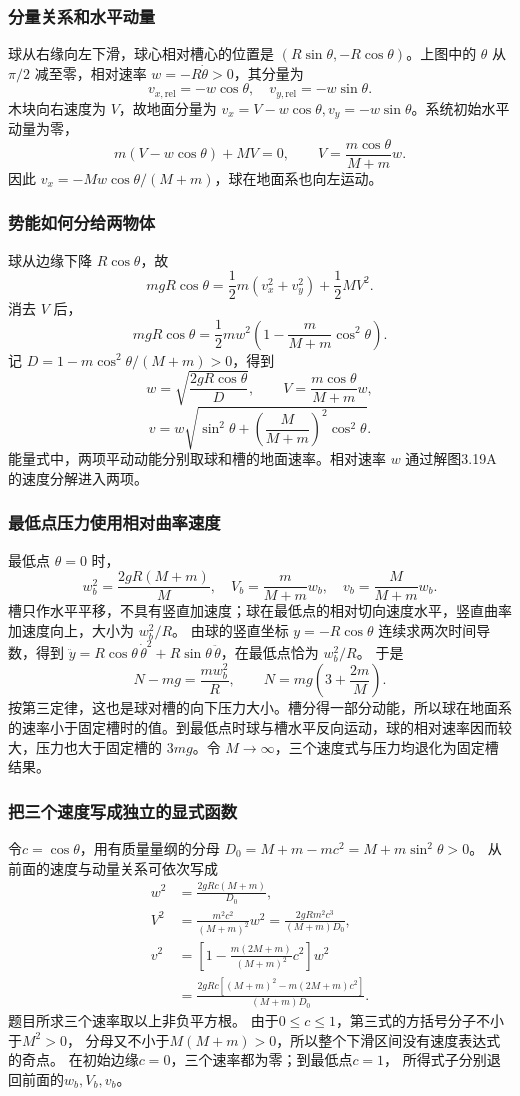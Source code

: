 \documentclass[UTF8,fontset=fandol,a4paper,11pt]{ctexart}
\begin{document}
\subsubsection*{分量关系和水平动量}
球从右缘向左下滑，球心相对槽心的位置是
$(R\sin\theta,-R\cos\theta)$。上图中的 $\theta$ 从 $\pi/2$ 减至零，相对速率 $w=-R\dot\theta>0$，其分量为
\[
v_{x,\mathrm{rel}}=-w\cos\theta,\quad
v_{y,\mathrm{rel}}=-w\sin\theta.
\]
木块向右速度为 $V$，故地面分量为
$v_x=V-w\cos\theta,v_y=-w\sin\theta$。系统初始水平动量为零，
\[
m(V-w\cos\theta)+MV=0,
\qquad \boxed{V=\frac{m\cos\theta}{M+m}w}.
\]
因此 $v_x=-Mw\cos\theta/(M+m)$，球在地面系也向左运动。

\subsubsection*{势能如何分给两物体}
球从边缘下降 $R\cos\theta$，故
\[
mgR\cos\theta=\frac12m(v_x^2+v_y^2)+\frac12MV^2.
\]
消去 $V$ 后，
\[
mgR\cos\theta
=\frac12m w^2\left(1-\frac{m}{M+m}\cos^2\theta\right).
\]
记 $D=1-m\cos^2\theta/(M+m)>0$，得到
\[
\boxed{w=\sqrt{\frac{2gR\cos\theta}{D}}},\qquad
\boxed{V=\frac{m\cos\theta}{M+m}w},
\]
\[
\boxed{v=w\sqrt{\sin^2\theta+
\left(\frac{M}{M+m}\right)^2\cos^2\theta}}.
\]
能量式中，两项平动动能分别取球和槽的地面速率。相对速率 $w$ 通过解图3.19A 的速度分解进入两项。

\subsubsection*{最低点压力使用相对曲率速度}
最低点 $\theta=0$ 时，
\[
w_b^2=\frac{2gR(M+m)}{M},\quad
V_b=\frac{m}{M+m}w_b,\quad
v_b=\frac{M}{M+m}w_b.
\]
槽只作水平平移，不具有竖直加速度；球在最低点的相对切向速度水平，竖直曲率加速度向上，大小为 $w_b^2/R$。
由球的竖直坐标 $y=-R\cos\theta$ 连续求两次时间导数，得到
$\ddot y=R\cos\theta\,\dot\theta^2+R\sin\theta\,\ddot\theta$，在最低点恰为 $w_b^2/R$。
于是
\[
N-mg=\frac{mw_b^2}{R},\qquad
\boxed{N=mg\left(3+\frac{2m}{M}\right)}.
\]
按第三定律，这也是球对槽的向下压力大小。槽分得一部分动能，所以球在地面系的速率小于固定槽时的值。到最低点时球与槽水平反向运动，球的相对速率因而较大，压力也大于固定槽的 $3mg$。令 $M\to\infty$，三个速度式与压力均退化为固定槽结果。
\subsubsection*{把三个速度写成独立的显式函数}
令$c=\cos\theta$，用有质量量纲的分母
$D_0=M+m-mc^2=M+m\sin^2\theta>0$。
从前面的速度与动量关系可依次写成
\[
\begin{aligned}
w^2&=\frac{2gRc(M+m)}{D_0},\\
V^2&=\frac{m^2c^2}{(M+m)^2}w^2
=\frac{2gRm^2c^3}{(M+m)D_0},\\
v^2&=\left[1-\frac{m(2M+m)}{(M+m)^2}c^2\right]w^2\\
&=\frac{2gRc[(M+m)^2-m(2M+m)c^2]}{(M+m)D_0}.
\end{aligned}
\]
题目所求三个速率取以上非负平方根。
由于$0\leq c\leq1$，第三式的方括号分子不小于$M^2>0$，
分母又不小于$M(M+m)>0$，所以整个下滑区间没有速度表达式的奇点。
在初始边缘$c=0$，三个速率都为零；到最低点$c=1$，
所得式子分别退回前面的$w_b,V_b,v_b$。
\end{document}
